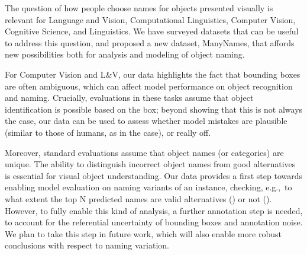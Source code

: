 
The question of how people choose names for objects presented visually is relevant for Language and Vision, Computational Linguistics, Computer Vision, Cognitive Science, and Linguistics.
We have surveyed datasets that can be useful to address this question, and proposed a new dataset, ManyNames, that affords new possibilities both for analysis and modeling of object naming.

For Computer Vision and L\&V, our data highlights the fact that bounding boxes are often ambiguous, which can affect model performance on object recognition and naming.
Crucially, evaluations in these tasks assume that object identification is possible based on the box; beyond showing that this is not always the case, our data can be used to assess whether model mistakes are plausible (similar to those of humans, as in the  case), or really off.

Moreover, standard evaluations assume that object names (or categories) are unique.
The ability to distinguish incorrect object names from good alternatives is essential for visual object understanding.
Our data provides a first step towards enabling model evaluation on naming variants of an instance, checking, e.g.,\ to what extent the top N predicted names are valid alternatives () or not ().
However, to fully enable this kind of analysis, a further annotation step is needed, to account for the referential uncertainty of bounding boxes and annotation noise.
We plan to take this step in future work, which will also enable more robust conclusions with respect to naming variation.

